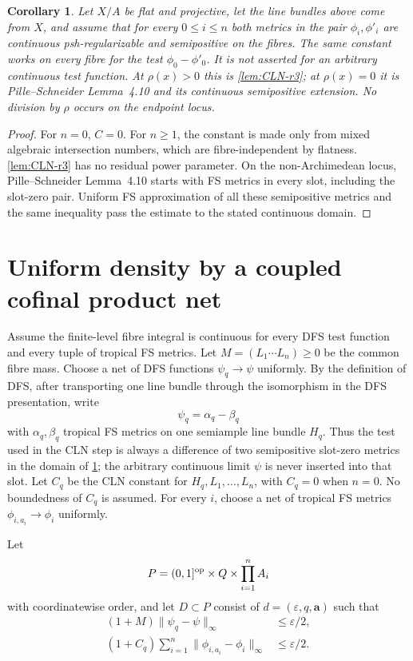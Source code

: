 \documentclass[11pt]{article}
\newtheorem{corollary}[theorem]{Corollary}
\newcommand{\eps}{\varepsilon}
\newcommand{\norm}[1]{\lVert#1\rVert}
\begin{document}
\medskip
\Needspace{0.22\textheight}
\begin{corollary}
\label{cor:uniform-family-r3}
Let $X/A$ be flat and projective, let the line bundles above come from $X$,
and assume that for every $0\leq i\leq n$ both metrics in the pair
$\phi_i,\phi'_i$ are continuous psh-regularizable and semipositive on the
fibres.  The same constant works on every fibre for the test
$\phi_0-\phi'_0$.  It is not asserted for an arbitrary continuous test
function.  At $\rho(x)>0$ this is \cref{lem:CLN-r3}; at
$\rho(x)=0$ it is Pille--Schneider Lemma~4.10 and its continuous
semipositive extension.  No division by $\rho$ occurs on the endpoint
locus.
\end{corollary}

\begin{proof}
For $n=0$, $C=0$.  For $n\geq1$, the constant is made only from mixed
algebraic intersection numbers, which are fibre-independent by flatness.
\cref{lem:CLN-r3} has no residual power parameter.  On the
non-Archimedean locus, Pille--Schneider Lemma~4.10 starts with FS metrics in
every slot, including the slot-zero pair.  Uniform FS approximation of all
these semipositive metrics and the same inequality pass the estimate to the
stated continuous domain.
\end{proof}

\section{Uniform density by a coupled cofinal product net}

Assume the finite-level fibre integral is continuous for every DFS test
function and every tuple of tropical FS metrics.  Let
$M=(L_1\cdots L_n)\geq0$ be the common fibre mass.  Choose a net of DFS
functions $\psi_q\to\psi$ uniformly.  By the definition of DFS, after
transporting one line bundle through the isomorphism in the DFS presentation,
write
\[
 \psi_q=\alpha_q-\beta_q
\]
with $\alpha_q,\beta_q$ tropical FS metrics on one semiample line bundle
$H_q$.  Thus the test used in the CLN step is always a difference of two
semipositive slot-zero metrics in the domain of
\cref{cor:uniform-family-r3}; the arbitrary continuous limit
$\psi$ is never inserted into that slot.
Let $C_q$ be the CLN constant for $H_q,L_1,\ldots,L_n$, with $C_q=0$
when $n=0$.  No boundedness of $C_q$ is assumed.  For every $i$, choose
a net of tropical FS metrics $\phi_{i,a_i}\to\phi_i$ uniformly.

Let
\[
 P=(0,1]^{\rm op}\times Q\times\prod_{i=1}^nA_i
\]
with coordinatewise order, and let $D\subset P$ consist of
$d=(\eps,q,\mathbf a)$ such that
\begin{align}
 (1+M)\norm{\psi_q-\psi}_\infty&\leq\eps/2,
\tag{5.1}\label{eq:D-test-r3}\\
 (1+C_q)\sum_{i=1}^n
 \norm{\phi_{i,a_i}-\phi_i}_\infty&\leq\eps/2.
\tag{5.2}\label{eq:D-metric-r3}
\end{align}
\end{document}
